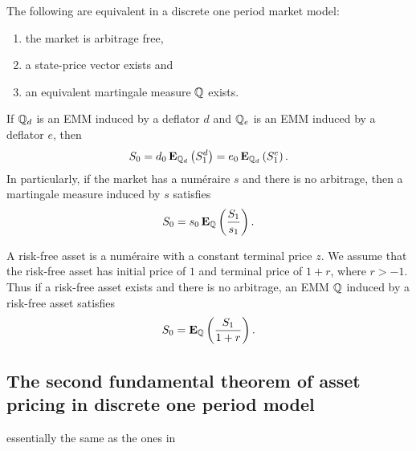 \begin{thm}
The following are equivalent in a discrete one period market model: 
  \begin{enumerate}[labelindent=\parindent, leftmargin=*]
    \item the market is arbitrage free,
    \item a state-price vector exists and
    \item an equivalent martingale measure $\mathbb{Q}$ exists.
  \end{enumerate}
If $\mathbb{Q}_d$ is an EMM induced by a deflator $d$ and $\mathbb{Q}_e$ is an EMM induced by a deflator $e$, then
  	\begin{align}
		S_0 = d_0 \operatorname{\boldsymbol{\mathrm{E}}}_{\mathbb{Q}_d} \left( S^d_1 \right) = e_0 \operatorname{\boldsymbol{\mathrm{E}}}_{\mathbb{Q}_d} \left( S^e_1 \right) .
	\end{align}	
In particularly, if the market has a num\'{e}raire $s$ and there is no arbitrage, then a martingale measure induced by $s$ satisfies
  	\begin{align}
		S_0 = s_0 \operatorname{\boldsymbol{\mathrm{E}}}_{\mathbb{Q}} \left( \frac{S_1}{s_1} \right).
	\end{align}
\end{thm}

A risk-free asset is a num\'{e}raire with a constant terminal price $z$. We assume that the risk-free asset has initial price of $1$ and terminal price of $1+r$, where $r > -1$. Thus if a risk-free asset exists and there is no arbitrage, an EMM $\mathbb{Q}$ induced by a risk-free asset satisfies
	\begin{align}
		S_0 = \operatorname{\boldsymbol{\mathrm{E}}}_{\mathbb{Q}} \left( \frac{S_1}{1+r} \right) .
	\end{align}


\subsection{The second fundamental theorem of asset pricing in discrete one period model}

 essentially the same as the ones in \textcite[pp. 31--34]{bjork2004arbitrage}

